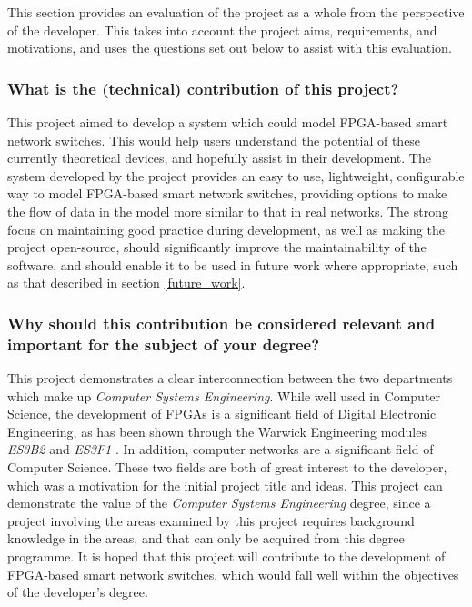This section provides an evaluation of the project as a whole from the perspective of the developer. This takes into account the project aims, requirements, and motivations, and uses the questions set out below to assist with this evaluation.


\subsubsection{What is the (technical) contribution of this project?}
This project aimed to develop a system which could model FPGA-based smart network switches. This would help users understand the potential of these currently theoretical devices, and hopefully assist in their development.
The system developed by the project provides an easy to use, lightweight, configurable way to model FPGA-based smart network switches, providing options to make the flow of data in the model more similar to that in real networks.
The strong focus on maintaining good practice during development, as well as making the project open-source, should significantly improve the maintainability of the software, and should enable it to be used in future work where appropriate, such as that described in section \ref{future_work}.

\subsubsection{Why should this contribution be considered relevant and important for the subject of your degree?}
This project demonstrates a clear interconnection between the two departments which make up \textit{Computer Systems Engineering}.
While well used in Computer Science, the development of FPGAs is a significant field of Digital Electronic Engineering, as has been shown through the Warwick Engineering modules \textit{ES3B2} \cite{es3b2} and \textit{ES3F1} \cite{es3f1}.
In addition, computer networks are a significant field of Computer Science.
These two fields are both of great interest to the developer, which was a motivation for the initial project title and ideas.
This project can demonstrate the value of the \textit{Computer Systems Engineering} degree, since a project involving the areas examined by this project requires background knowledge in the areas, and that can only be acquired from this degree programme.
It is hoped that this project will contribute to the development of FPGA-based smart network switches, which would fall well within the objectives of the developer's degree.

